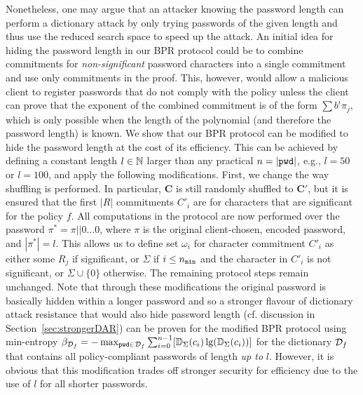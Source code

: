 Nonetheless, one may argue that an attacker knowing the password length can perform a dictionary attack by only trying passwords of the given length and thus use the reduced search space to speed up the attack. An initial idea for hiding the password length in our BPR protocol could be to combine commitments for \emph{non-significant} password characters into a single commitment and use only \pmin commitments in the proof. This, however, would allow a malicious client to register passwords that do not comply with the policy unless the client can prove that the exponent of the combined commitment is of the form $\sum b^i\pi_j$, which is only possible when the length of the polynomial (and therefore the password length) is known.
We show that our BPR protocol can be modified to hide the password length at the cost of its efficiency. This can be achieved by defining a constant length $l\in\mathbb{N}$ larger than any practical $n=|\mathtt{pwd}|$, e.g., $l=50$ or $l=100$, and apply the following modifications. First, we change the way shuffling is performed.
In particular, $\bm C$ is still randomly shuffled to $\bm C'$, but it is ensured that the first $|R|$ commitments $C'_i$ are for characters that are significant for the policy $f$.
All computations in the protocol are now performed over the password $\pi^\ast=\pi||0\dots 0$, where $\pi$ is the original client-chosen, encoded password, and $|\pi^\ast|=l$.
This allows us to define set $\omega_i$ for character commitment $C'_i$ as either some $R_j$ if significant, or $\Sigma$ if $i\leq{n_\mathtt{min}}$ and the character in $C'_i$ is not significant, or $\Sigma \cup \{0\}$ otherwise. 
The remaining protocol steps remain unchanged.
Note that through these modifications the original password is basically hidden within a longer password and so a stronger flavour of dictionary attack resistance that would also hide password length (cf. discussion in Section~\ref{sec:strongerDAR}) can be proven for the modified BPR protocol using min-entropy
$\beta_{\mathcal{D}_{f}} = -\max_{\mathtt{pwd}\in \mathcal{D}_{f}} \sum_{i=0}^{n-1} [\mathbb{D}_\Sigma(c_i)\lg(\mathbb{D}_\Sigma(c_i))]$
for the dictionary $\mathcal{D}_{f}$ that contains all policy-compliant passwords of length \emph{up to} $l$.
However, it is obvious that this modification trades off stronger security for efficiency due to the use of $l$ for all shorter passwords.


